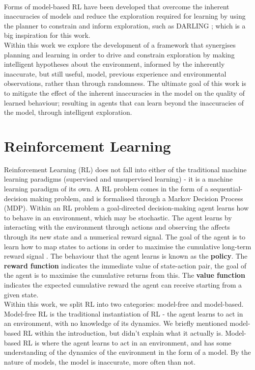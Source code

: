 \\Forms of model-based RL have been developed that overcome the inherent inaccuracies of models and reduce the exploration required for learning by using the planner to constrain and inform exploration, such as DARLING \cite{AIJ16-leonetti}; which is a big inspiration for this work.
\\Within this work we explore the development of a framework that synergises planning and learning in order to drive and constrain exploration by making intelligent hypotheses about the environment, informed by the inherently inaccurate, but still useful, model, previous experience and environmental observations, rather than through randomness. The ultimate goal of this work is to mitigate the effect of the inherent inaccuracies in the model on the quality of learned behaviour; resulting in agents that can learn beyond the inaccuracies of the model, through intelligent exploration.


\section{Reinforcement Learning}
Reinforcement Learning (RL) does not fall into either of the traditional machine learning paradigms (supervised and unsupervised learning) - it is a machine learning paradigm of its own. A RL problem comes in the form of a sequential-decision making problem, and is formalised through a Markov Decision Process (MDP). Within an RL problem a goal-directed decision-making agent learns how to behave in an environment, which may be stochastic. The agent learns by interacting with the environment through actions and observing the affects through its new state and a numerical reward signal. The goal of the agent is to learn how to map states to actions in order to maximise the cumulative long-term reward signal \cite{DBLP:books/lib/SuttonB98}. The behaviour that the agent learns is known as the \textbf{policy}. The \textbf{reward function} indicates the immediate value of state-action pair, the goal of the agent is to maximise the cumulative returns from this. The \textbf{value function} indicates the expected cumulative reward the agent can receive starting from a given state.
\\Within this work, we split RL into two categories: model-free and model-based. Model-free RL is the traditional instantiation of RL - the agent learns to act in an environment, with no knowledge of its dynamics. We briefly mentioned model-based RL within the introduction, but didn't explain what it actually is. Model-based RL is where the agent learns to act in an environment, and has some understanding of the dynamics of the environment in the form of a model. By the nature of models, the model is inaccurate, more often than not.


